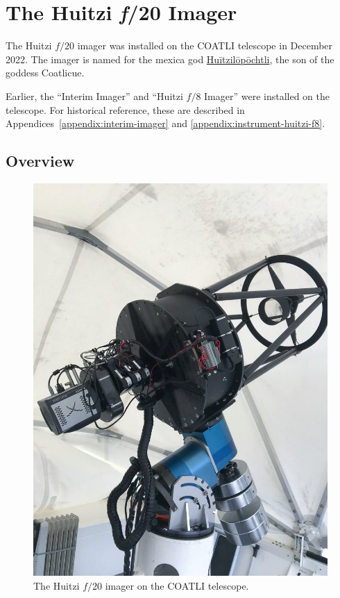 
\chapter{The Huitzi \/{\textit f}/20 Imager}

The Huitzi $f/20$ imager was installed on the COATLI telescope in December 2022. The imager is named for the mexica god \href{https://en.wikipedia.org/wiki/Huītzilōpōchtli}{Huītzilōpōchtli}, the son of the goddess Coatlicue.

Earlier, the “Interim Imager” and “Huitzi $f/8$ Imager” were installed on the telescope. For historical reference, these are described in Appendices~\ref{appendix:interim-imager} and \ref{appendix:instrument-huitzi-f8}.

\section{Overview}

\begin{figure}[p]
\begin{center}
\includegraphics[width=0.7\linewidth]{figures/huitzi-f20-on-telescope.jpg}
\medskip
\caption{The Huitzi $f/20$ imager on the COATLI telescope.}
\label{figure:huitzi-f20-on-coatli}
\end{center}
\end{figure}

